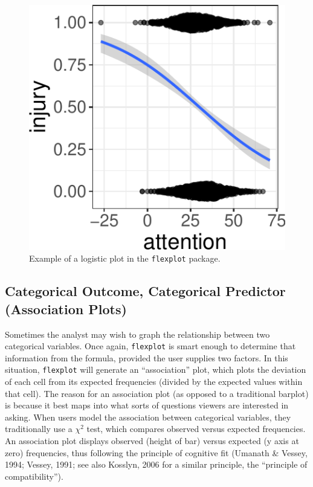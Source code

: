 \documentclass[
  man]{apa6}
\begin{document}
\begin{figure}
\centering
\includegraphics{flexplot_psychmeth_files/figure-latex/logistic-1.pdf}
\caption{\label{fig:logistic}Example of a logistic plot in the \texttt{flexplot} package.\label{fig:logistic}}
\end{figure}

\normalsize

\hypertarget{categorical-outcome-categorical-predictor-association-plots}{%
\subsection{Categorical Outcome, Categorical Predictor (Association Plots)}\label{categorical-outcome-categorical-predictor-association-plots}}

Sometimes the analyst may wish to graph the relationship between two categorical variables. Once again, \texttt{flexplot} is smart enough to determine that information from the formula, provided the user supplies two factors. In this situation, \texttt{flexplot} will generate an ``association'' plot, which plots the deviation of each cell from its expected frequencies (divided by the expected values within that cell). The reason for an association plot (as opposed to a traditional barplot) is because it best maps into what sorts of questions viewers are interested in asking. When users model the association between categorical variables, they traditionally use a \(\chi^2\) test, which compares observed versus expected frequencies. An association plot displays observed (height of bar) versus expected (y axis at zero) frequencies, thus following the principle of cognitive fit (Umanath \& Vessey, 1994; Vessey, 1991; see also Kosslyn, 2006 for a similar principle, the ``principle of compatibility'').
\end{document}
